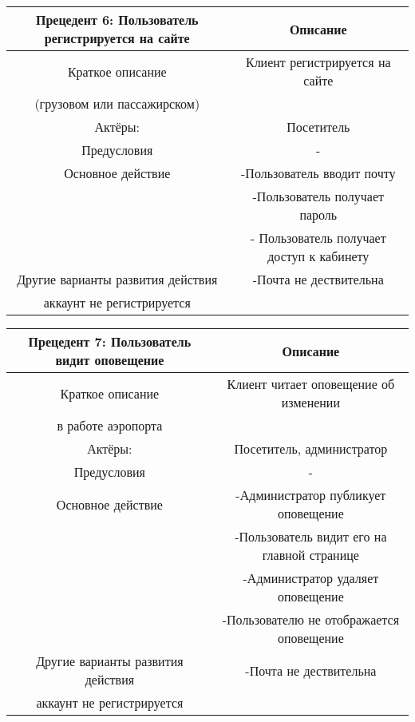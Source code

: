 \begin{table}
    \begin{tabular}{|c|c|}
    \hline
    Прецедент 6: Пользователь регистрируется на сайте          & Описание                                                                                              \\ \hline
    Краткое описание                  & Клиент регистрируется на сайте\\(грузовом или пассажирском)                                                           \\ \hline
    Актёры:                           & Посетитель                                                                                         \\ \hline
    Предусловия                       & -                                                                                                 \\ \hline
    Основное действие                 & -Пользователь вводит почту\\ &-Пользователь получает пароль\\ &- Пользователь получает доступ к кабинету\\ \hline
    Другие варианты развития действия & -Почта не дествительна\\аккаунт не регистрируется                                                \\ \hline
    \end{tabular}
\end{table}

\begin{table}
    \begin{tabular}{|c|c|}
    \hline
    Прецедент 7: Пользователь видит оповещение         & Описание                                                                                              \\ \hline
    Краткое описание                  & Клиент читает оповещение об изменении\\в работе аэропорта                                                        \\ \hline
    Актёры:                           & Посетитель, администратор                                                                                         \\ \hline
    Предусловия                       & -                                                                                                 \\ \hline
    Основное действие                 & -Администратор публикует оповещение\\ &-Пользователь видит его на главной странице\\ 
    &-Администратор удаляет оповещение\\ &-Пользователю не отображается оповещение \\ \hline
    Другие варианты развития действия & -Почта не дествительна\\аккаунт не регистрируется                                                \\ \hline
    \end{tabular}
\end{table}

